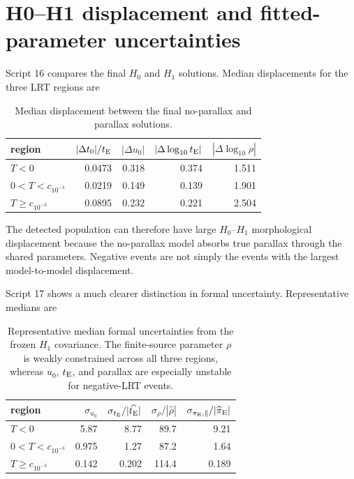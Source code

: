 \documentclass[11pt,a4paper]{article}
\newcommand{\te}{t_{\rm E}}
\newcommand{\Hnull}{H_0}
\newcommand{\Halt}{H_1}
\begin{document}
\section{H0--H1 displacement and fitted-parameter uncertainties}

Script 16 compares the final $\Hnull$ and $\Halt$ solutions.  Median
displacements for the three LRT regions are
\begin{table}[H]
\centering
\begin{tabular}{lrrrr}
\toprule
region &
$|\Delta t_0|/\te$ &
$|\Delta u_0|$ &
$|\Delta\log_{10}\te|$ &
$|\Delta\log_{10}\rho|$\\
\midrule
$T<0$ & 0.0473 & 0.318 & 0.374 & 1.511\\
$0<T<c_{10^{-3}}$ & 0.0219 & 0.149 & 0.139 & 1.901\\
$T\ge c_{10^{-3}}$ & 0.0895 & 0.232 & 0.221 & 2.504\\
\bottomrule
\end{tabular}
\caption{Median displacement between the final no-parallax and parallax
solutions.}
\end{table}

The detected population can therefore have large $\Hnull$--$\Halt$
morphological displacement because the no-parallax model absorbs true parallax
through the shared parameters.  Negative events are not simply the events with
the largest model-to-model displacement.

Script 17 shows a much clearer distinction in formal uncertainty.  Representative
medians are
\begin{table}[H]
\centering
\begin{tabular}{lrrrr}
\toprule
region &
$\sigma_{u_0}$ &
$\sigma_{\te}/|\widehat{\te}|$ &
$\sigma_\rho/|\widehat\rho|$ &
$\sigma_{\pi_{\rm E},\parallel}/|\widehat{\pi}_{\rm E}|$\\
\midrule
$T<0$ & 5.87 & 8.77 & 89.7 & 9.21\\
$0<T<c_{10^{-3}}$ & 0.975 & 1.27 & 87.2 & 1.64\\
$T\ge c_{10^{-3}}$ & 0.142 & 0.202 & 114.4 & 0.189\\
\bottomrule
\end{tabular}
\caption{Representative median formal uncertainties from the frozen $\Halt$
covariance.  The finite-source parameter $\rho$ is weakly constrained across
all three regions, whereas $u_0$, $\te$, and parallax are especially unstable
for negative-LRT events.}
\end{table}
\end{document}
